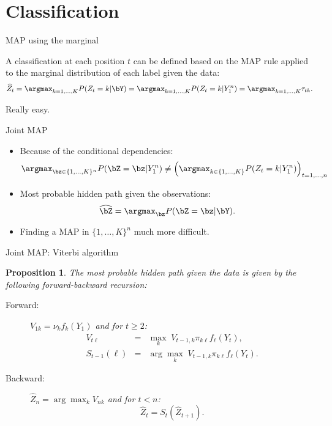 \documentclass[compress,10pt]{beamer}
\newtheorem{proposition}{Proposition}
\begin{document}
\section{Classification}


\begin{frame}{MAP using the marginal}

A classification at each position $t$ can be defined based on the MAP rule  applied to the marginal distribution of each label given the data:
$$
\widehat{Z}_t = \argmax_{k=1,\dots,K} P(Z_t = k | \bY)  = \argmax_{k=1,\dots,K} P(Z_t = k | Y_{1}^n)  = \argmax_{k=1,\dots,K} \tau_{tk}.
$$

Really easy. 

\end{frame}

 

\begin{frame}{Joint MAP}

\begin{itemize}
 \item Because of the conditional dependencies: 
$$\argmax_{\bz \in \{1,\dots,K\}^n} P(\bZ =\bz| Y_{1}^n) \neq \left(\argmax_{k\in \{1,\dots,K\}} P(Z_t =k| Y_{1}^n) \right)_{t=1,\dots,n} $$
\item Most probable hidden path given the observations:
$$
\widehat{\bZ} = \argmax_\bz P(\bZ = \bz | \bY).
$$

\item \textcolor{dgreen}{Finding a MAP in $\{1, \dots, K\}^n$ much more difficult}.
\end{itemize}

 
\end{frame}

 

\begin{frame}{Joint MAP: Viterbi algorithm}
\begin{proposition}
 The most probable hidden path given the data is given by the following forward-backward recursion:
  \begin{description}
   \item[Forward:] $V_{1k} = \nu_k f_k(Y_1)$ and for $t \geq 2$:
    \begin{eqnarray*}
      V_{t\ell} & = & \max_k \; V_{t-1, k} \pi_{k\ell} f_\ell(Y_t), \\
      S_{t-1}(\ell) & = & \arg\max_k \; V_{t-1, k} \pi_{k\ell} f_\ell(Y_t).
    \end{eqnarray*}
    \item[Backward:] $\widehat{Z}_n = \arg\max_k V_{nk}$ and for $t < n$:
    $$
    \widehat{Z}_t = S_t(\widehat{Z}_{t+1}).
    $$
  \end{description}
\end{proposition}

\end{frame}
 
\end{document}
